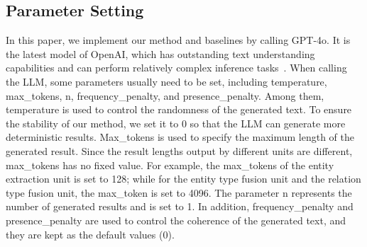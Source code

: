 \subsection{Parameter Setting}\label{sec: paramterset}
In this paper, we implement our method and baselines by calling GPT-4o.
It is the latest model of OpenAI, which has outstanding text understanding capabilities and can perform relatively complex inference tasks~\cite{GPT4oAnalysis-1}.
When calling the LLM, some parameters usually need to be set, including temperature, max\_tokens, n, frequency\_penalty, and presence\_penalty.
Among them, temperature is used to control the randomness of the generated text.
To ensure the stability of our method, we set it to 0 so that the LLM can generate more deterministic results. 
Max\_tokens is used to specify the maximum length of the generated result. 
Since the result lengths output by different units are different, max\_tokens has no fixed value. 
For example, the max\_tokens of the entity extraction unit is set to 128; 
while for the entity type fusion unit and the relation type fusion unit, the max\_token is set to 4096. 
The parameter n represents the number of generated results and is set to 1. 
In addition, frequency\_penalty and presence\_penalty are used to control the coherence of the generated text, and they are kept as the default values (0).

